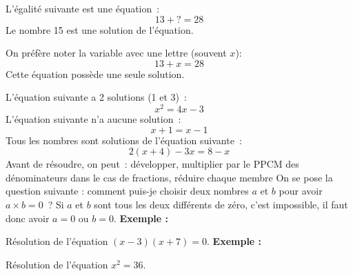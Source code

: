 \documentclass{thecours}
\begin{document}
    \medskip\par{}
    L'égalité suivante est une équation~:$$13+?=28$$
    Le nombre 15 est une solution de l'équation.%
    \medskip\par{}
    On préfère noter la variable avec une lettre (souvent $x$):$$13+x=28$$
    Cette équation possède une seule solution.
    \medskip\par{}
    L'équation suivante a 2 solutions (1 et 3)~:$$x^2=4x-3$$
    L'équation suivante n'a aucune solution~:$$x+1=x-1$$
    Tous les nombres sont solutions de l'équation suivante~:$$2(x+4)-3x=8-x$$
    \newpage{}
        Avant de résoudre, on peut~:
        développer, multiplier par le PPCM des dénominateurs dans le cas de fractions,
        réduire chaque membre
            On se pose la question suivante : comment puis-je choisir deux nombres $a$ et
            $b$ pour avoir $a\times b=0$~?
            Si $a$ et $b$ sont tous les deux différents de zéro, c'est impossible, il faut
            donc avoir $a=0$ ou $b=0$.
            {\bfseries Exemple :}\par\noindent
            Résolution de l'équation $(x-3)(x+7)=0$.
            {\bfseries Exemple :}\par\noindent
            Résolution de l'équation $x^2=36$.
\end{document}
